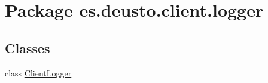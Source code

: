 \hypertarget{namespacees_1_1deusto_1_1client_1_1logger}{}\section{Package es.\+deusto.\+client.\+logger}
\label{namespacees_1_1deusto_1_1client_1_1logger}
\subsection*{Classes}
\begin{DoxyCompactItemize}
\item 
class \mbox{\hyperlink{classes_1_1deusto_1_1client_1_1logger_1_1_client_logger}{Client\+Logger}}
\end{DoxyCompactItemize}
